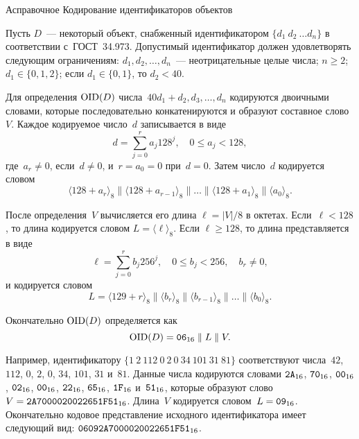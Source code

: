 \begin{appendix}{А}{справочное}
{Кодирование идентификаторов объектов}
\label{BER}

\mbox{}

Пусть $D$~--- некоторый объект, 
снабженный идентификатором $\{d_1\ d_2\ \ldots d_n\}$
в соответствии с~ГОСТ~34.973.
%
Допустимый идентификатор должен удовлетворять следующим ограничениям:
$d_1,d_2,\ldots,d_n$~--- неотрицательные целые числа;
$n\geq 2$; $d_1\in\{0,1,2\}$;
если $d_1\in\{0,1\}$, то $d_2<40$.

Для определения $\text{\normalfont OID}(D)$ числа~$40 d_1 + d_2,d_3,\ldots,d_n$ 
кодируются двоичными словами,
которые последовательно конкатенируются и образуют составное слово~$V$.
%
Каждое кодируемое число~$d$ записывается в виде 
$$
d=\sum_{j=0}^{r}a_j 128^j,\quad
0\leq a_j<128,
$$
где~$a_r\neq 0$, если~$d\neq 0$, и~$r=a_0=0$ при~$d=0$.
%
Затем число~$d$ кодируется словом
$$
\langle 128+a_r \rangle_8\parallel
\langle 128+a_{r-1} \rangle_8\parallel
\ldots\parallel
\langle 128+a_1 \rangle_8\parallel
\langle a_0 \rangle_8.
$$

После определения~$V$ вычисляется его длина $\ell=|V|/8$ в октетах.  
%
Если~$\ell<128$, то длина кодируется словом $L=\langle\ell\rangle_{8}$.
Если $\ell\geq 128$, то длина представляется в виде
$$
\ell=\sum_{j=0}^r b_j 256^j,\quad
0\leq b_j<256,\quad
b_r\neq 0,
$$
и кодируется словом 
$$
L=\langle 129+r\rangle_8\parallel
\langle b_r\rangle_8\parallel
\langle b_{r-1}\rangle_8\parallel\ldots\parallel
\langle b_0\rangle_8.
$$

Окончательно $\text{\normalfont OID}(D)$ определяется как
$$
\text{\normalfont OID}(D)=\texttt{06}_{16}\parallel L\parallel V.
$$

Например, идентификатору $\{1\ 2\ 112\ 0\ 2\ 0\ 34\ 101\ 31\ 81\}$
соответствуют числа~$42$, 
$112$, 
$0$, 
$2$, 
$0$, 
$34$, 
$101$, 
$31$ 
и~$81$.
Данные числа кодируются словами 
$\texttt{2A}_{16}$, 
$\texttt{70}_{16}$, 
$\texttt{00}_{16}$,
$\texttt{02}_{16}$,
$\texttt{00}_{16}$,
$\texttt{22}_{16}$,
$\texttt{65}_{16}$,
$\texttt{1F}_{16}$
и~$\texttt{51}_{16}$,
которые образуют слово~$V=\texttt{2A7000020022651F51}_{16}$.
Длина~$V$ кодируется словом~$L=\texttt{09}_{16}$.
Окончательно кодовое представление
исходного идентификатора имеет следующий вид: 
$\texttt{06092A7000020022651F51}_{16}$.

\end{appendix}

